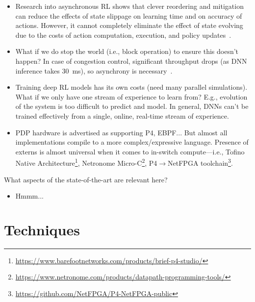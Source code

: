 \documentclass[sigconf,natbib=false]{acmart}
\begin{document}
\begin{itemize}
	\item Research into asynchronous RL shows that clever reordering and mitigation can reduce the effects of state slippage on learning time and on accuracy of actions. However, it cannot completely eliminate the effect of state evolving due to the costs of action computation, execution, and policy updates~\cite{DBLP:journals/firai/TravnikMSP18}.
	
	\item What if we do stop the world (i.e., block operation) to ensure this doesn't happen? In case of congestion control, significant throughput drops (as DNN inference takes \SI{30}{\milli\second}), so asynchrony is necessary~\cite{DBLP:journals/corr/abs-1910-04054}.
	
	\item Training deep RL models has its own costs (need many parallel simulations). What if we only have one stream of experience to learn from? E.g., evolution of the system is too difficult to predict and model. In general, DNNs can't be trained effectively from a single, online, real-time stream of experience.
	
	\item PDP hardware is advertised as supporting P4, EBPF... But almost all implementations compile to a more complex/expressive language. Presence of externs is almost universal when it comes to in-switch compute---i.e., Tofino Native Architecture\footnote{\url{    https://www.barefootnetworks.com/products/brief-p4-studio/}}, Netronome Micro-C\footnote{\url{https://www.netronome.com/products/datapath-programming-tools/}}, P4$\rightarrow$NetFPGA toolchain\footnote{\url{https://github.com/NetFPGA/P4-NetFPGA-public}}.
\end{itemize}

What aspects of the state-of-the-art are relevant here?

\begin{itemize}
	\item Hmmm...
\end{itemize}

\section{Techniques}
\end{document}
